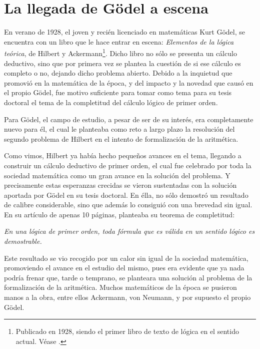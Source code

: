 \section{La llegada de Gödel a escena} 

En verano de 1928, el joven y recién licenciado en matemáticas Kurt Gödel, se encuentra con un libro que le hace entrar en escena: \textit{Elementos de la lógica teórica}, de 
Hilbert y Ackermann\footnote{Publicado en 1928, siendo el primer libro de texto de lógica en el sentido actual. Véase \cite{hilbert1962elementos}.}. Dicho libro no sólo se presenta un cálculo deductivo, 
sino que por primera vez se plantea la cuestión de si ese cálculo es completo o no, dejando dicho problema abierto. Debido a la inquietud que promovió en la matemática de la época,
y del impacto y la novedad que causó en el propio Gödel, fue motivo suficiente para tomar como tema para su tesis doctoral el tema de la completitud del cálculo lógico de primer orden.

Para Gödel, el campo de estudio, a pesar de ser de su interés, era completamente nuevo para él, el cual le planteaba como reto a largo plazo la resolución del segundo problema
de Hilbert en el intento de formalización de la aritmética. 

Como vimos, Hilbert ya había hecho pequeños avances en el tema, llegando a construir un cálculo deductivo de primer orden, el cual fue celebrado por toda la sociedad matemática 
como un gran avance en la solución del problema. Y precisamente estas esperanzas crecidas se vieron sustentadas con la solución aportada por Gödel en su tesis doctoral. En élla, 
no sólo demostró un resultado de calibre considerable, sino que además lo consiguió con una brevedad sin igual. En su artículo de apenas 10 páginas, planteaba su teorema de completitud:

\begin{center}
    \textit{En una lógica de primer orden, toda fórmula que es válida en un sentido lógico es demostrable.}
\end{center}

Este resultado se vio recogido por un calor sin igual de la sociedad matemática, promoviendo el avance en el estudio del mismo, pues era evidente que ya nada podría frenar que, tarde o 
temprano, se planteara una solución al problema de la formalización de la aritmética. Muchos matemáticos de la época se pusieron manos a la obra, entre ellos Ackermann, von Neumann,
y por supuesto el propio Gödel.

